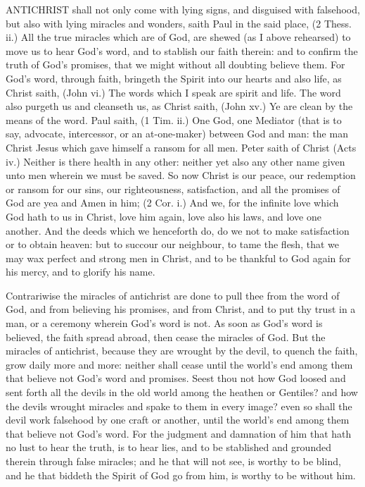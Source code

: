 ANTICHRIST shall not only come with lying signs,
and disguised with falsehood, but also with lying miracles
and wonders, saith Paul in the said place, (2 Thess. 
ii.) All the true miracles which are of God, are shewed (as 
I above rehearsed) to move us to hear God's word, and to 
stablish our faith therein: and to confirm the truth of 
God's promises, that we might without all doubting believe 
them. For God's word, through faith, bringeth the Spirit 
into our hearts and also life, as Christ saith, (John vi.) 
The words which I speak are spirit and life. The word 
also purgeth us and cleanseth us, as Christ saith, (John 
xv.) Ye are clean by the means of the word. Paul saith, 
(1 Tim. ii.) One God, one Mediator (that is to say, advocate,
intercessor, or an at-one-maker) between God and 
man: the man Christ Jesus which gave himself a ransom 
for all men. Peter saith of Christ (Acts iv.) Neither is there 
health in any other: neither yet also any other name 
given unto men wherein we must be saved. So now 
Christ is our peace, our redemption or ransom for our sins, 
our righteousness, satisfaction, and all the promises of God 
are yea and Amen in him; (2 Cor. i.) And we, for the 
infinite love which God hath to us in Christ, love him 
again, love also his laws, and love one another. And the
deeds which we henceforth do, do we not to make satisfaction
or to obtain heaven: but to succour our neighbour, to
tame the flesh, that we may wax perfect and strong men 
in Christ, and to be thankful to God again for his mercy, 
and to glorify his name. 

Contrariwise the miracles of antichrist are done to
pull thee from the word of God, and from believing his promises,
and from Christ, and to put thy trust in a man, or a
ceremony wherein God's word is not. As soon as God's word 
is believed, the faith spread abroad, then cease the miracles 
of God. But the miracles of antichrist, because they are 
wrought by the devil, to quench the faith, grow daily more 
and more: neither shall cease until the world's end among 
them that believe not God's word and promises. Seest 
thou not how God loosed and sent forth all the devils in 
the old world among the heathen or Gentiles? and how 
the devils wrought miracles and spake to them in every 
image? even so shall the devil work falsehood by one craft 
or another, until the world's end among them that believe 
not God's word. For the judgment and damnation of him 
that hath no lust to hear the truth, is to hear lies, and to 
be stablished and grounded therein through false miracles; 
and he that will not see, is worthy to be blind, and he that
biddeth the Spirit of God go from him, is worthy to be 
without him. 

